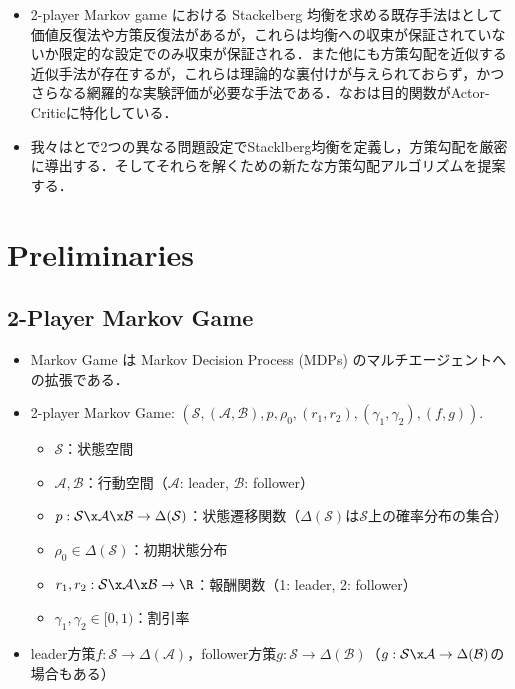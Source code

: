 \documentclass[a4paper,10pt,dvipdfmx]{jsarticle}
\begin{document}
\begin{itemize}
\begin{itemize}
    \end{itemize}
    \item 2-player Markov game における Stackelberg 均衡を求める既存手法はとして価値反復法\cite{Bucarey2022-ro,Zhang2020-hw}や方策反復法\cite{Kudo2024-cu}があるが，これらは均衡への収束が保証されていないか限定的な設定でのみ収束が保証される．また他にも方策勾配を近似する近似手法\cite{Yang2023-tf,Rajeswaran-ym}が存在するが，これらは理論的な裏付けが与えられておらず，かつさらなる網羅的な実験評価が必要な手法である．なお\cite{Zheng2022-xj}は目的関数がActor-Criticに特化している．
    \item 我々はとで2つの異なる問題設定でStacklberg均衡を定義し，方策勾配を厳密に導出する．そしてそれらを解くための新たな方策勾配アルゴリズムを提案する．
\end{itemize}

\section{Preliminaries}

\subsection{2-Player Markov Game}

\begin{itemize}
    \item Markov Game は Markov Decision Process (MDPs) のマルチエージェントへの拡張である．
    \item 2-player Markov Game: $(\mathcal{S}, (\mathcal{A},\mathcal{B}), p, \rho_0, (r_1,r_2), (\gamma_1,\gamma_2),(f,g))$.
    \begin{itemize}
        \item $\mathcal{S}$：状態空間
        \item $\mathcal{A, B}$：行動空間（$\mathcal{A}$: leader, $\mathcal{B}$: follower）
        \item $p: \mathcal{S}\x\mathcal{A}\x\mathcal{B}\to\Delta(\mathcal{S})$：状態遷移関数（$\Delta(\mathcal{S})$は$\mathcal{S}$上の確率分布の集合）
        \item $\rho_0\in\Delta(\mathcal{S})$：初期状態分布
        \item $r_1,r_2:\mathcal{S}\x\mathcal{A}\x\mathcal{B}\to\R$：報酬関数（1: leader, 2: follower）
        \item $\gamma_1,\gamma_2\in[0,1)$：割引率
    \end{itemize}
    \item leader方策$f:\mathcal{S}\to\Delta(\mathcal{A})$，follower方策$g:\mathcal{S}\to\Delta(\mathcal{B})$（$g:\mathcal{S}\x\mathcal{A}\to\Delta(\mathcal{B})$の場合もある）
\end{itemize}
\end{document}
